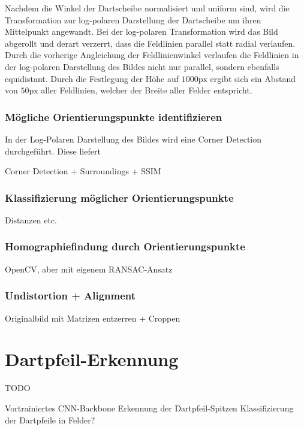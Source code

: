 Nachdem die Winkel der Dartscheibe normalisiert und uniform sind, wird die Transformation zur log-polaren Darstellung der Dartscheibe um ihren Mittelpunkt angewandt. Bei der log-polaren Transformation wird das Bild abgerollt und derart verzerrt, dass die Feldlinien parallel statt radial verlaufen. Durch die vorherige Angleichung der Feldlinienwinkel verlaufen die Feldlinien in der log-polaren Darstellung des Bildes nicht nur parallel, sondern ebenfalls equidistant. Durch die Festlegung der Höhe auf $1000\text{px}$ ergibt sich ein Abstand von $50\text{px}$ aller Feldlinien, welcher der Breite aller Felder entspricht.

\subsubsection{Mögliche Orientierungspunkte identifizieren}
\label{sec:impl:cv:orient:points}

In der Log-Polaren Darstellung des Bildes wird eine Corner Detection durchgeführt. Diese liefert

Corner Detection + Surroundings + SSIM

\subsubsection{Klassifizierung möglicher Orientierungspunkte}
\label{sec:impl:cv:orient:sorting}
Distanzen etc.

\subsubsection{Homographiefindung durch Orientierungspunkte}
\label{sec:impl:cv:orient:homography}
OpenCV, aber mit eigenem RANSAC-Ansatz

\subsubsection{Undistortion + Alignment}
\label{sec:impl:cv:orient:undistort}
Originalbild mit Matrizen entzerren + Croppen


\section{Dartpfeil-Erkennung}
\label{sec:impl:ki}

TODO

Vortrainiertes CNN-Backbone
Erkennung der Dartpfeil-Spitzen
Klassifizierung der Dartpfeile in Felder?

